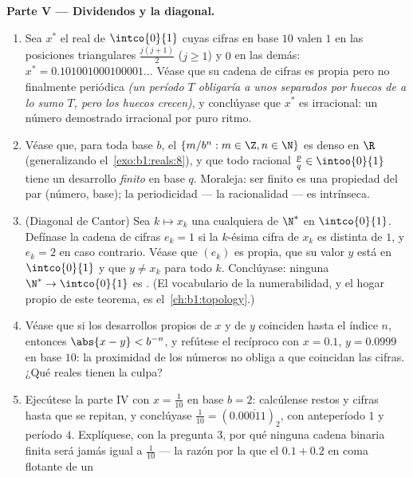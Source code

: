 \begin{problem}
\medskip
\noindent\textbf{Parte V --- Dividendos y la diagonal.}
\begin{enumerate}[resume]
  \item Sea $x^*$ el real de $\intco{0}{1}$ cuyas cifras en base $10$
        valen $1$ en las posiciones triangulares $\frac{j(j + 1)}{2}$
        ($j \geq 1$) y $0$ en las demás: $x^* =
        0.101001000100001\dots$ Véase que su cadena de cifras es propia
        pero no finalmente periódica \emph{(un período $T$ obligaría a
        unos separados por huecos de a lo sumo $T$, pero los huecos
        crecen)}, y conclúyase que $x^*$ es irracional: un número
        demostrado irracional por puro ritmo.
  \item Véase que, para toda base $b$, el 
        $\{m/b^n : m \in \Z, n \in \N\}$ es denso en $\R$
        (generalizando el~\cref{exo:b1:reals:8}), y que todo racional
        $\frac pq \in \intoo{0}{1}$ tiene un desarrollo
        \emph{finito} en base $q$. Moraleja: ser finito es una
        propiedad del par (número, base); la periodicidad --- la
        racionalidad --- es intrínseca.
  \item (Diagonal de Cantor) Sea $k \mapsto x_k$ una 
        cualquiera de $\N^*$ en $\intco{0}{1}$. Defínase la cadena de
        cifras $e_k = 1$ si la $k$-ésima cifra de $x_k$ es distinta de
        $1$, y $e_k = 2$ en caso contrario. Véase que $(e_k)$ es
        propia, que su valor $y$ está en $\intco{0}{1}$ y que
        $y \neq x_k$ para todo $k$. Conclúyase: ninguna 
        $\N^* \to \intco{0}{1}$ es . (El vocabulario de la
        numerabilidad, y el hogar propio de este teorema, es
        el~\cref{ch:b1:topology}.)
  \item Véase que si los desarrollos propios de $x$ y de $y$ coinciden
        hasta el índice $n$, entonces $\abs{x - y} < b^{-n}$, y
        refútese el recíproco con $x = 0.1$, $y = 0.0999$ en base $10$:
        la proximidad de los números no obliga a que coincidan las
        cifras. ¿Qué reales tienen la culpa?
  \item Ejecútese la parte IV con $x = \frac{1}{10}$ en base $b = 2$:
        calcúlense restos y cifras hasta que se repitan, y conclúyase
        $\frac{1}{10} = (0.0\overline{0011})_2$, con anteperíodo $1$ y
        período $4$. Explíquese, con la pregunta 3, por qué ninguna
        cadena binaria finita será jamás igual a $\frac{1}{10}$ --- la
        razón por la que el $0.1 + 0.2$ en coma flotante de un

\end{enumerate}
\end{problem}
